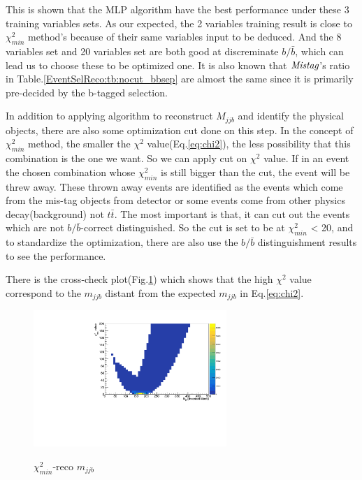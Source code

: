 		This is shown that the MLP algorithm have the best performance under these 3 training variables sets. As our expected, the 2 variables training result is close to $\chi^2_{min}$ method's because of their same variables input to be deduced. And the 8 variables set and 20 variables set are both good at discreminate $b/\bar{b}$, which can lead us to choose these to be optimized one. It is also known that $\emph{Mistag}$'s ratio in Table.\ref{EventSelReco:tb:nocut_bbsep} are almost the same since it is primarily pre-decided by the b-tagged selection.

		In addition to applying algorithm to reconstruct $M_{jjb}$ and identify the physical objects, there are also some optimization cut done on this step. In the concept of $\chi^2_{min}$ method, the smaller the $\chi^2$ value(Eq.\ref{eq:chi2}), the less possibility that this combination is the one we want. So we can apply cut on $\chi^2$ value. If in an event the chosen combination whose $\chi^2_{min}$ is still bigger than the cut, the event will be threw away. These thrown away events are identified as the events which come from the mis-tag objects from detector or some events come from other physics decay(background) not $t\bar{t}$. The most important is that, it can cut out the events which are not $b/\bar{b}$-correct distinguished. So the cut is set to be at $\chi^2_{min}$ < 20, and to standardize the optimization, there are also use the $b/\bar{b}$ distinguishment results to see the performance.

		There is the cross-check plot(Fig.\ref{EventSelReco:fig:chi2_2D}) which shows that the high $\chi^2$ value correspond to the $m_{jjb}$ distant from the expected $m_{jjb}$ in Eq.\ref{eq:chi2}.

		\begin{figure}[H]
		\centering{}
    		\includegraphics[width=0.65\textwidth]{Figures/EventSelReco/bbsep/chi2_2D.pdf}\\
		\caption{$\chi^2_{min}$-reco $m_{jjb}$}
		\label{EventSelReco:fig:chi2_2D}
		\end{figure}
		\FloatBarrier

